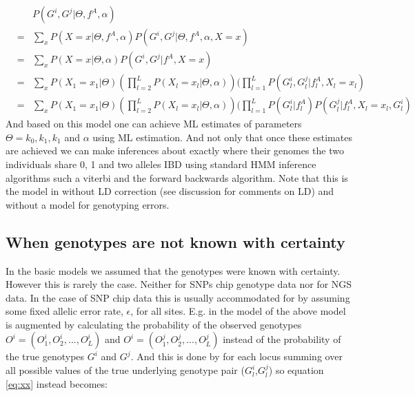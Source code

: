 \documentclass[a4paper, 11pt]{article}
\begin{document}
\footnotesize%
\begin{eqnarray}%
&&P(G^{i},G^{j}| \Theta,f^A,\alpha)\\
&=& \sum_x P(X=x|\Theta,f^A,\alpha)P(G^{i},G^{j}| \Theta,f^A,\alpha,X=x)\\
&=& \sum_x P(X=x|\Theta,\alpha)P(G^{i},G^{j}|f^A,X=x)\\
&=& \sum_x P(X_1=x_1|\Theta) (\prod_{l=2}^L P(X_l=x_l|\Theta,\alpha))(\prod_{l=1}^LP(G^{i}_l,G^{j}_l|f^A_l,X_l=x_l)\\
&=& \sum_x P(X_1=x_1|\Theta) (\prod_{l=2}^L P(X_l=x_l|\Theta,\alpha))(\prod_{l=1}^LP(G^{i}_l|f^A_l)P(G^{j}_l|f^A_l,X_l=x_l,G^{i}_l) \label{eq:xx}
\end{eqnarray}%
\normalsize
And based on this model one can achieve ML estimates of parameters $\Theta=k_0,k_1, k_1$ and $\alpha$ using ML estimation. And not only that once these estimates are achieved we can make inferences about exactly where their genomes the two individuals share 0, 1 and two alleles IBD using standard HMM inference algorithms such a viterbi and the forward backwards algorithm.  
Note that this is the model in \cite{Albrechtsen09} without LD correction (see discussion for comments on LD) and without a model for genotyping errors.

\subsection*{When genotypes are not known with certainty}
In the basic models we assumed that the genotypes were known with certainty. However this is rarely the case. Neither for SNPs chip genotype data nor for NGS data. In the case of SNP chip data this is usually accommodated for by assuming some fixed allelic error rate,  $\epsilon$, for all sites.  E.g. in the model of \cite{Albrechtsen09} the above model is augmented by calculating the probability of the observed genotypes $O^{i}=(O^{i}_1,O^{i}_2,...,O^{i}_L)$ and $O^{i}=(O^{j}_1,O^{j}_2,...,O^{j}_L)$ instead of the probability of the true genotypes $G^i$ and $G^j$. And this is done by for each locus summing over all possible values of the true underlying genotype pair ($G^{i}_l$,$G^{j}_l$) so equation \ref{eq:xx} instead becomes:%
\end{document}
